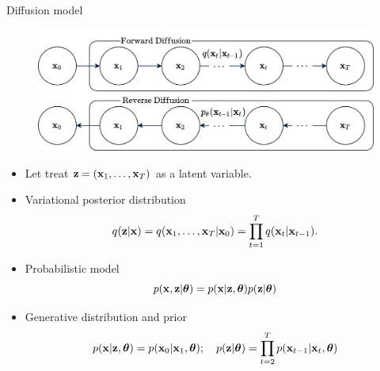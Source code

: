 \begin{frame}{Diffusion model}
	\begin{figure}
		\includegraphics[width=0.75\linewidth]{figs/diffusion_pgm}
	\end{figure}
	\begin{itemize}
		\item Let treat $\mathbf{z} = (\mathbf{x}_1, \dots, \mathbf{x}_T)$ as a latent variable.
		\item Variational posterior distribution
		\vspace{-0.3cm}
		\[
			q(\mathbf{z} | \mathbf{x}) = q(\mathbf{x}_1, \dots, \mathbf{x}_T | \mathbf{x}_0) = \prod_{t = 1}^T q(\mathbf{x}_t | \mathbf{x}_{t - 1}).
		\]
		\vspace{-0.5cm}
		\item Probabilistic model
		\[
			p(\mathbf{x}, \mathbf{z} | \boldsymbol{\theta}) = p(\mathbf{x} | \mathbf{z}, \boldsymbol{\theta}) p(\mathbf{z} | \boldsymbol{\theta})
		\]
		\item Generative distribution and prior
		\vspace{-0.3cm}
		\[
			p(\mathbf{x} | \mathbf{z}, \boldsymbol{\theta}) = p(\mathbf{x}_0 | \mathbf{x}_1, \boldsymbol{\theta}); \quad 
			p(\mathbf{z} | \boldsymbol{\theta}) = \prod_{t=2}^T p(\mathbf{x}_{t - 1} | \mathbf{x}_t, \boldsymbol{\theta})
		\]
	\end{itemize}
\end{frame}
